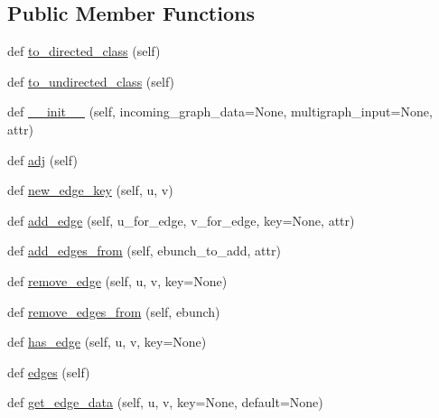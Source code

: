 \subsection*{Public Member Functions}
\begin{DoxyCompactItemize}
\item 
def \hyperlink{classnetworkx_1_1classes_1_1multigraph_1_1MultiGraph_ac2fbefff5f966867081af0c054d75b4c}{to\+\_\+directed\+\_\+class} (self)
\item 
def \hyperlink{classnetworkx_1_1classes_1_1multigraph_1_1MultiGraph_acf6039f4ab4a2fbca08d0c76d92c6357}{to\+\_\+undirected\+\_\+class} (self)
\item 
def \hyperlink{classnetworkx_1_1classes_1_1multigraph_1_1MultiGraph_a4207e5a486c0644d6126bfea182136d1}{\+\_\+\+\_\+init\+\_\+\+\_\+} (self, incoming\+\_\+graph\+\_\+data=None, multigraph\+\_\+input=None, attr)
\item 
def \hyperlink{classnetworkx_1_1classes_1_1multigraph_1_1MultiGraph_a6242012627ea0cf734c57d93182eb10b}{adj} (self)
\item 
def \hyperlink{classnetworkx_1_1classes_1_1multigraph_1_1MultiGraph_ae125eb2d60100c0b4b270031c0e7db18}{new\+\_\+edge\+\_\+key} (self, u, v)
\item 
def \hyperlink{classnetworkx_1_1classes_1_1multigraph_1_1MultiGraph_a239819819299de72e4dbd64f37d09710}{add\+\_\+edge} (self, u\+\_\+for\+\_\+edge, v\+\_\+for\+\_\+edge, key=None, attr)
\item 
def \hyperlink{classnetworkx_1_1classes_1_1multigraph_1_1MultiGraph_a0b46c8a0ec80143a93fffa594c6985f1}{add\+\_\+edges\+\_\+from} (self, ebunch\+\_\+to\+\_\+add, attr)
\item 
def \hyperlink{classnetworkx_1_1classes_1_1multigraph_1_1MultiGraph_ad6b782513b6d265485cda61ce06e7113}{remove\+\_\+edge} (self, u, v, key=None)
\item 
def \hyperlink{classnetworkx_1_1classes_1_1multigraph_1_1MultiGraph_af98830a4639ab324205c8cb6f5a6204a}{remove\+\_\+edges\+\_\+from} (self, ebunch)
\item 
def \hyperlink{classnetworkx_1_1classes_1_1multigraph_1_1MultiGraph_a9c0bf0c1fb96a49acf22228ef5873b22}{has\+\_\+edge} (self, u, v, key=None)
\item 
def \hyperlink{classnetworkx_1_1classes_1_1multigraph_1_1MultiGraph_ae17fc1693be84c2794bd039cfe9a16f9}{edges} (self)
\item 
def \hyperlink{classnetworkx_1_1classes_1_1multigraph_1_1MultiGraph_a175f9d9a37277cc88193f876d01be3cc}{get\+\_\+edge\+\_\+data} (self, u, v, key=None, default=None)

\end{DoxyCompactItemize}
